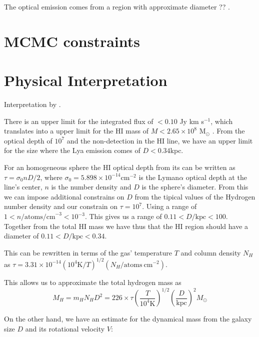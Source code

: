 \documentclass[a4paper, usenatbib, 12pt]{article}
\begin{document}
{The optical emission  comes from a   region with approximate diameter
?? \cite{Fricke01}. 

\section*{MCMC constraints}

\section*{Physical Interpretation}

Interpretation by \cite{mashesse03}.

There is an upper limit for the  
integrated flux of $<0.10$ Jy km s$^{-1}$, which translates into a
upper limit for the HI mass of $M<2.65\times 10^{8}$ M$_{\odot}$
\cite{pustilnikmartin07}. 
From the optical depth of $10^7$ and the non-detection in the HI line,
we have an upper limit for the size where the Lya emission comes of
$D<0.34$kpc. 

 For an homogeneous sphere the HI optical depth from its can be
 written as $\tau = \sigma_0 n D/2$, where $\sigma_0=5.898\times
10^{-14}$cm$^{-2}$ is the Lyman$\alpha$  optical depth at the 
line's center, $n$ is the number density and $D$ is the sphere's
diameter. 
From this we can impose additional constrains on $D$ from the tipical
values of the Hydrogen number density and our constrain on
$\tau=10^{7}$.  Using a range of $1<n/\mathrm{atoms/cm}^{-3} <
10^{-3}$. This gives us a range of $0.11 < D/\mathrm{kpc}<100$. 
Together from the total HI mass we have thus that the HI region should
have a diameter of $0.11 < D/\mathrm{kpc}<0.34$.



This can be rewritten in terms of the gas' temperature $T$ and column
density $N_{H}$as $\tau = 3.31 \times 10^{-14} (10^{4}\mathrm{K}/T)^{1/2}
(N_{H}/\mathrm{atoms\ cm}^{-2})$.  

This allows us to approximate the total hydrogen mass as
\begin{equation}
M_{H} = m_{H}  N_{H} D^{2} = 226\times \tau  \left(\frac{T}{10^4
  \mathrm{K}}\right)^{1/2}\left(\frac{D}{\mathrm{kpc}}\right)^2M_{\odot}
\end{equation}





On the other hand, we have an estimate for the dynamical mass from the
galaxy size $D$ and its rotational velocity $V$:



}
\end{document}
